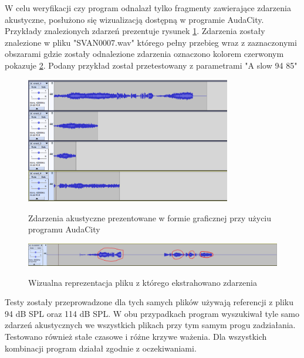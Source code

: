\documentclass[eng,printmode]{mgr}
\begin{document}
W celu weryfikacji czy program odnalazł tylko fragmenty zawierające zdarzenia akustyczne, posłużono się wizualizacją dostępną w programie AudaCity. Przykłady znalezionych zdarzeń prezentuje rysunek \ref{znalezione_zdarzenia}. Zdarzenia zostały znalezione w pliku "SVAN0007.wav" którego pełny przebieg wraz z zaznaczonymi obszarami  gdzie zostały odnalezione zdarzenia oznaczono kolorem czerwonym pokazuje \ref{przebieg}. Podany przykład został przetestowany z parametrami "A slow 94 85"

\begin{figure}[hbtp]
\caption{Zdarzenia akustyczne prezentowane w formie graficznej przy użyciu programu AudaCity}
\centering
\includegraphics[width=0.8\textwidth]{zdarzeniaAuda.PNG}
\label{znalezione_zdarzenia}
\end{figure}

\begin{figure}[hbtp]
\caption{Wizualna reprezentacja pliku z którego ekstrahowano zdarzenia}
\centering
\includegraphics[angle=90,origin=c, scale = 0.6]{oryginalAuda.PNG}
\label{przebieg}
\end{figure}

Testy zostały przeprowadzone dla tych samych plików używają referencji z pliku 94 dB SPL oraz 114 dB SPL. W obu przypadkach program wyszukiwał tyle samo zdarzeń akustycznych we wszystkich plikach przy tym samym progu zadziałania. Testowano również stałe czasowe i różne krzywe ważenia. Dla wszystkich kombinacji program działał zgodnie z oczekiwaniami. 

\appendix
{} %

\listoffigures
\lstlistoflistings
\end{document}
